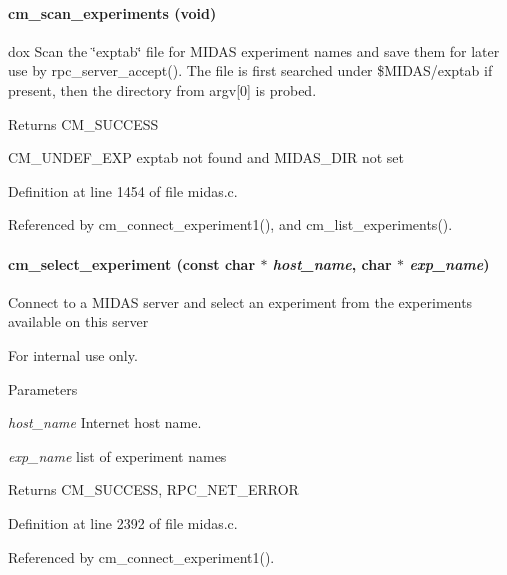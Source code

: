 \paragraph[{cm\_\-scan\_\-experiments}]{ cm\_\-scan\_\-experiments (void)}\hfill\label{group__cmfunctionc_gacd0316ccf242cd450281c5fd153a985b}
dox Scan the \char`\"{}exptab\char`\"{} file for MIDAS experiment names and save them for later use by rpc\_\-server\_\-accept(). The file is first searched under \$MIDAS/exptab if present, then the directory from argv\mbox{[}0\mbox{]} is probed. \begin{DoxyReturn}{Returns}
CM\_\-SUCCESS\par
 CM\_\-UNDEF\_\-EXP exptab not found and MIDAS\_\-DIR not set 
\end{DoxyReturn}


Definition at line 1454 of file midas.c.

Referenced by cm\_\-connect\_\-experiment1(), and cm\_\-list\_\-experiments().
\paragraph[{cm\_\-select\_\-experiment}]{ cm\_\-select\_\-experiment (const char $\ast$ {\em host\_\-name}, \/  char $\ast$ {\em exp\_\-name})}\hfill\label{group__cmfunctionc_ga5b4ff6bff1fa714ea4697e317d39ea0f}
Connect to a MIDAS server and select an experiment from the experiments available on this server \begin{DoxyInternal}{For internal use only.}

\begin{DoxyParams}{Parameters}
\item[{\em host\_\-name}]Internet host name. \item[{\em exp\_\-name}]list of experiment names \end{DoxyParams}
\begin{DoxyReturn}{Returns}
CM\_\-SUCCESS, RPC\_\-NET\_\-ERROR 
\end{DoxyReturn}
\end{DoxyInternal}


Definition at line 2392 of file midas.c.

Referenced by cm\_\-connect\_\-experiment1().
